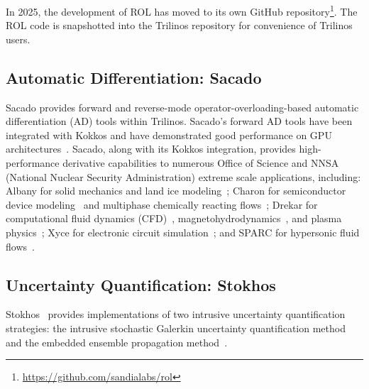 In 2025, the development of ROL has moved to its own GitHub repository\footnote{\url{https://github.com/sandialabs/rol}}.
The ROL code is snapshotted into the Trilinos repository for convenience of Trilinos users.

\subsection{Automatic Differentiation: Sacado} \label{sec:sacado}

Sacado \cite{SacadoURL,phipps2012efficient,phipps2008large} provides forward and reverse-mode operator-overloading-based automatic differentiation (AD) tools within Trilinos.
Sacado's forward AD tools have been integrated with Kokkos and have demonstrated good performance on GPU architectures~\cite{phipps2022automatic}.
Sacado, along with its Kokkos integration, provides high-performance derivative capabilities to numerous Office of Science and NNSA (National Nuclear Security Administration) extreme scale applications, including: Albany for solid mechanics and land ice modeling~\cite{Salinger2016,MPASAlbany2018};
Charon for semiconductor device modeling~\cite{CharonUsersManual2020} and multiphase chemically reacting flows~\cite{Musson2009}; Drekar for computational fluid dynamics (CFD)~\cite{Sondak2021,Shadid2016}, magnetohydrodynamics~\cite{Shadid2016mhd}, and
plasma physics~\cite{Crockatt2022,Miller2019}; Xyce for electronic circuit simulation~\cite{xyceTrilinos,xycePCE}; and SPARC for hypersonic fluid flows~\cite{SparcValidation}.

\subsection{Uncertainty Quantification: Stokhos}

Stokhos~\cite{phipps2015stokhos,Phipps2016,phipps2014exploring} provides implementations of two intrusive uncertainty quantification strategies:
the intrusive stochastic Galerkin uncertainty quantification method~\cite{ghanem1990polynomial,ghanem2003stochastic} and the embedded ensemble propagation method~\cite{phipps2017embedded}.

